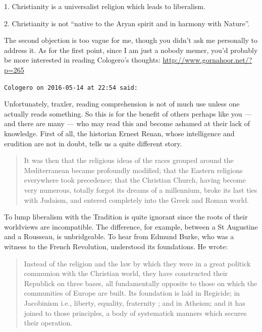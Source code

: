 \begin{footnotesize}
\begin{sffamily}
1. Christianity is a universalist religion which leads to liberalism.

2. Christianity is not ``native to the Aryan spirit and in harmony with Nature''.

The second objection is too vague for me, though you didn't ask me personally to address it. As for the first point, since I am just a nobody memer, you'd probably be more interested in reading Cologero's thoughts: \url{http://www.gornahoor.net/?p=265}

\hfill

\texttt{Cologero on 2016-05-14 at 22:54 said:}

Unfortunately, traxler, reading comprehension is not of much use unless one actually reads something. So this is for the benefit of others perhaps like you --- and there are many --- who may read this and become ashamed at their lack of knowledge. First of all, the historian Ernest Renan, whose intelligence and erudition are not in doubt, tells us a quite different story.

\begin{quote}\footnotesize

It was then that the religious ideas of the races grouped around the Mediterranean became profoundly modified; that the Eastern religions everywhere took precedence; that the Christian Church, having become very numerous, totally forgot its dreams of a millennium, broke its last ties with Judaism, and entered completely into the Greek and Roman world.
\end{quote}


To lump liberalism with the Tradition is quite ignorant since the roots of their worldviews are incompatible. The difference, for example, between a St Augustine and a Rousseau, is unbridgeable. To hear from Edmund Burke, who was a witness to the French Revolution, understood its foundations. He wrote:

\begin{quote}\footnotesize

Instead of the religion and the law by which they were in a great politick communion with the Christian world, they have constructed their Republick on three bases, all fundamentally opposite to those on which the communities of Europe are built. Its foundation is laid in Regicide; in Jacobinism i.e., liberty, equality, fraternity ; and in Atheism; and it has joined to those principles, a body of systematick manners which secures their operation.
\end{quote}



\end{sffamily}
\end{footnotesize}
